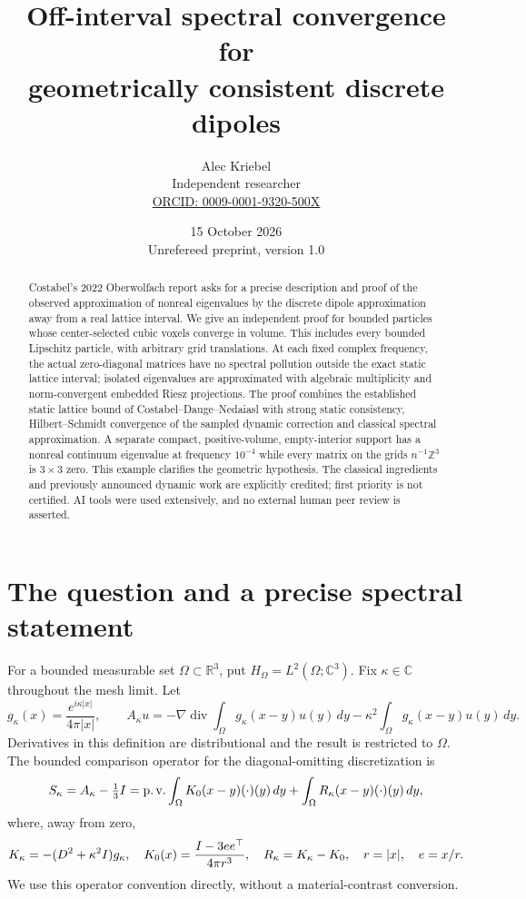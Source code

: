 \documentclass[11pt]{article}
\title{Off-interval spectral convergence for\\geometrically consistent discrete dipoles}
\author{Alec Kriebel\\\small Independent researcher\\
\small\href{https://orcid.org/0009-0001-9320-500X}{ORCID: 0009-0001-9320-500X}}
\date{15 October 2026\\\small Unrefereed preprint, version 1.0}
\theoremstyle{remark}\newtheorem{remark}[theorem]{Remark}
\newcommand{\R}{\mathbb R}\newcommand{\C}{\mathbb C}\newcommand{\Z}{\mathbb Z}
\newcommand{\pv}{\operatorname{p.v.}}\newcommand{\dist}{\operatorname{dist}}
\begin{document}
\maketitle
\begin{abstract}
Costabel's 2022 Oberwolfach report asks for a precise description and proof of the observed approximation of nonreal eigenvalues by the discrete dipole approximation away from a real lattice interval. We give an independent proof for bounded particles whose center-selected cubic voxels converge in volume. This includes every bounded Lipschitz particle, with arbitrary grid translations. At each fixed complex frequency, the actual zero-diagonal matrices have no spectral pollution outside the exact static lattice interval; isolated eigenvalues are approximated with algebraic multiplicity and norm-convergent embedded Riesz projections. The proof combines the established static lattice bound of Costabel--Dauge--Nedaiasl with strong static consistency, Hilbert--Schmidt convergence of the sampled dynamic correction and classical spectral approximation. A separate compact, positive-volume, empty-interior support has a nonreal continuum eigenvalue at frequency $10^{-4}$ while every matrix on the grids $n^{-1}\Z^3$ is $3\times3$ zero. This example clarifies the geometric hypothesis. The classical ingredients and previously announced dynamic work are explicitly credited; first priority is not certified. AI tools were used extensively, and no external human peer review is asserted.
\end{abstract}

\section{The question and a precise spectral statement}

For a bounded measurable set $\Omega\subset\R^3$, put $H_\Omega=L^2(\Omega;\C^3)$. Fix $\kappa\in\C$ throughout the mesh limit. Let
\[
 g_\kappa(x)=\frac{e^{i\kappa|x|}}{4\pi|x|},\qquad
 A_\kappa u=-\nabla\operatorname{div}\int_\Omega g_\kappa(x-y)u(y)\,dy
                -\kappa^2\int_\Omega g_\kappa(x-y)u(y)\,dy .
\]
Derivatives in this definition are distributional and the result is restricted to $\Omega$. The bounded comparison operator for the diagonal-omitting discretization is
\begin{equation}\label{eq:shift}
 S_\kappa=A_\kappa-\tfrac13\Id
   =\pv\int_\Omega K_0(x-y)(\cdot)(y)\,dy
          +\int_\Omega R_\kappa(x-y)(\cdot)(y)\,dy,
\end{equation}
where, away from zero,
\begin{equation}\label{eq:kernels}
 K_\kappa=-(D^2+\kappa^2I)g_\kappa,
 \quad K_0(x)=\frac{I-3ee^\top}{4\pi r^3},
 \quad R_\kappa=K_\kappa-K_0,\quad r=|x|,\quad e=x/r.
\end{equation}
We use this operator convention directly, without a material-contrast conversion.
\end{document}
